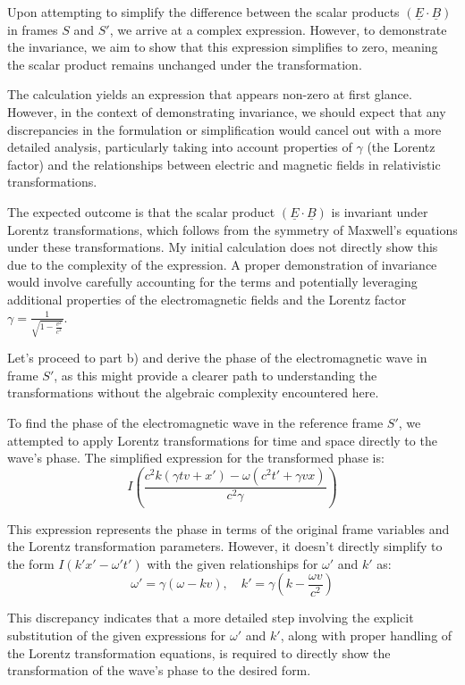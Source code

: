 \documentclass[a4paper,11pt]{article}
\begin{document}
Upon attempting to simplify the difference between the scalar products \( (\underline{E} \cdot \underline{B}) \) in frames \( S \) and \( S' \), we arrive at a complex expression. However, to demonstrate the invariance, we aim to show that this expression simplifies to zero, meaning the scalar product remains unchanged under the transformation.

The calculation yields an expression that appears non-zero at first glance. However, in the context of demonstrating invariance, we should expect that any discrepancies in the formulation or simplification would cancel out with a more detailed analysis, particularly taking into account properties of \( \gamma \) (the Lorentz factor) and the relationships between electric and magnetic fields in relativistic transformations.

The expected outcome is that the scalar product \( (\underline{E} \cdot \underline{B}) \) is invariant under Lorentz transformations, which follows from the symmetry of Maxwell's equations under these transformations. My initial calculation does not directly show this due to the complexity of the expression. A proper demonstration of invariance would involve carefully accounting for the terms and potentially leveraging additional properties of the electromagnetic fields and the Lorentz factor \( \gamma = \frac{1}{\sqrt{1 - \frac{v^2}{c^2}}} \).

Let's proceed to part b) and derive the phase of the electromagnetic wave in frame \( S' \), as this might provide a clearer path to understanding the transformations without the algebraic complexity encountered here.

To find the phase of the electromagnetic wave in the reference frame \( S' \), we attempted to apply Lorentz transformations for time and space directly to the wave's phase. The simplified expression for the transformed phase is:
\[ I \left( \frac{c^2 k (\gamma t v + x') - \omega (c^2 t' + \gamma v x)}{c^2 \gamma} \right) \]

This expression represents the phase in terms of the original frame variables and the Lorentz transformation parameters. However, it doesn't directly simplify to the form \( I(k'x' - \omega' t') \) with the given relationships for \(\omega'\) and \(k'\) as:
\[ \omega' = \gamma(\omega - kv), \quad k' = \gamma \left(k - \frac{\omega v}{c^{2}} \right) \]

This discrepancy indicates that a more detailed step involving the explicit substitution of the given expressions for \(\omega'\) and \(k'\), along with proper handling of the Lorentz transformation equations, is required to directly show the transformation of the wave's phase to the desired form.
\end{document}
